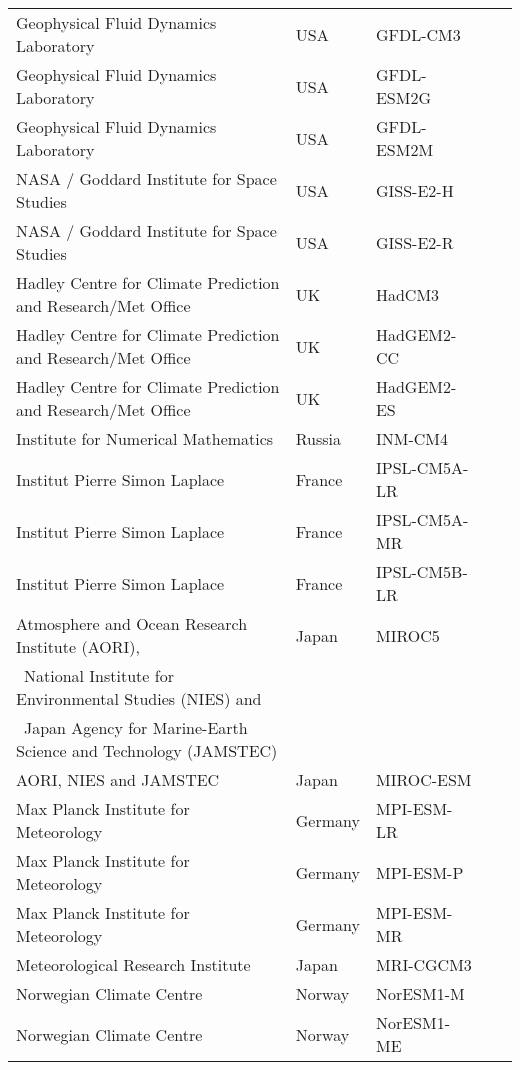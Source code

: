 \begin{center}
\begin{table}[h]
\begin{tabular}{ l  l  l  l l}
Geophysical Fluid Dynamics Laboratory & USA & GFDL-CM3 \\
Geophysical Fluid Dynamics Laboratory & USA & GFDL-ESM2G \\
Geophysical Fluid Dynamics Laboratory & USA & GFDL-ESM2M \\
NASA / Goddard Institute for Space Studies & USA & GISS-E2-H \\
NASA / Goddard Institute for Space Studies & USA & GISS-E2-R \\
Hadley Centre for Climate Prediction and Research/Met Office & UK & HadCM3 \\
Hadley Centre for Climate Prediction and Research/Met Office & UK & HadGEM2-CC 
 \\
Hadley Centre for Climate Prediction and Research/Met Office & UK & HadGEM2-ES 
 \\
Institute for Numerical Mathematics & Russia & INM-CM4 \\
Institut Pierre Simon Laplace & France & IPSL-CM5A-LR \\
Institut Pierre Simon Laplace & France & IPSL-CM5A-MR \\
Institut Pierre Simon Laplace & France & IPSL-CM5B-LR \\
		Atmosphere and Ocean Research Institute (AORI),    & Japan & MIROC5 \\
		\	National Institute for Environmental Studies (NIES) and  &&& \\
		\	Japan Agency for Marine-Earth Science and Technology (JAMSTEC) && & \\
AORI, NIES and JAMSTEC		& Japan & MIROC-ESM \\
Max Planck Institute for Meteorology & Germany & MPI-ESM-LR \\
Max Planck Institute for Meteorology & Germany & MPI-ESM-P \\
Max Planck Institute for Meteorology & Germany & MPI-ESM-MR \\
Meteorological Research Institute & Japan & MRI-CGCM3 \\
Norwegian Climate Centre & Norway & NorESM1-M \\
Norwegian Climate Centre & Norway & NorESM1-ME \\
	\end{tabular}
	\end{table}
\end{center}



